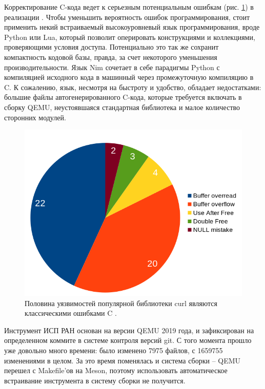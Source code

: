 Корректирование C-кода ведет к серьезным потенциальным ошибкам (рис. \ref{fig:curl-c-issues}) в реализации \cite{qemu-c-style}.
Чтобы уменьшить вероятность ошибок программирования, стоит применить некий встраиваемый
высокоуровневый язык программирования, вроде Python или Lua, который позволит оперировать
конструкциями и коллекциями, проверяющими условия доступа. Потенциально это так же сохранит
компактность кодовой базы, правда, за счет некоторого уменьшения производительности. \label{better-logic}
Язык Nim \cite{nim} сочетает в себе парадигмы Python с компиляцией исходного кода в машинный через
промежуточную компиляцию в C. К сожалению, язык, несмотря на быстроту и удобство, обладает
недостатками: большие файлы автогенерированного C-кода, которые требуется включать в сборку QEMU,
неустоявшаяся стандартная библиотека и малое количество сторонних модулей.

\begin{figure}[!htbp]
    \centering
    \begin{adjustbox}{max totalsize={0.8\textwidth}{\textheight}}
        \includegraphics[]{images/curl-c-issues.png}
    \end{adjustbox}
    \caption{Половина уязвимостей популярной библиотеки curl являются классическими ошибками C \cite{curl-errors}.}\label{fig:curl-c-issues}
\end{figure}

Инструмент ИСП РАН основан на версии QEMU 2019 года, и зафиксирован на определенном коммите в системе
контроля версий git. С того момента прошло уже довольно много времени: было изменено 7975 файлов, с 1659755 изменениями в целом.
За это время поменялась и система сборки -- QEMU перешел с Makefile'ов на Meson, поэтому
использовать автоматическое встраивание инструмента в систему сборки не получится.

